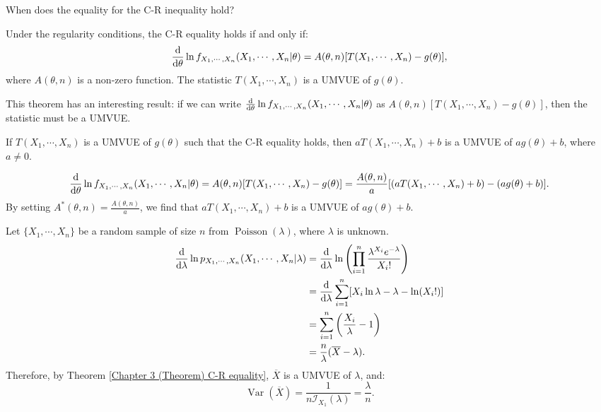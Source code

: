 \documentclass{huhtakm-template-book-v2}
\DeclareMathOperator{\Var}{Var}
\DeclareMathOperator{\Poisson}{Poisson}
\begin{document}
    When does the equality for the C-R inequality hold?
    \begin{thm}
        \label{Chapter 3 (Theorem) C-R equality}
        Under the regularity conditions, the C-R equality holds if and only if:
        \begin{equation*}
            \odv*{\ln{f_{X_{1},\cdots,X_{n}}(X_{1},\cdots,X_{n}|\theta)}}{\theta}=A(\theta,n)[T(X_{1},\cdots,X_{n})-g(\theta)],
        \end{equation*}
        where $A(\theta,n)$ is a non-zero function. The statistic $T(X_{1},\cdots,X_{n})$ is a UMVUE of $g(\theta)$. 
    \end{thm}
    This theorem has an interesting result: if we can write $\odv*{\ln{f_{X_{1},\cdots,X_{n}}(X_{1},\cdots,X_{n}|\theta)}}{\theta}$ as $A(\theta,n)[T(X_{1},\cdots,X_{n})-g(\theta)]$, then the statistic must be a UMVUE.
    \begin{lem}
        If $T(X_{1},\cdots,X_{n})$ is a UMVUE of $g(\theta)$ such that the C-R equality holds, then $aT(X_{1},\cdots,X_{n})+b$ is a UMVUE of $ag(\theta)+b$, where $a\neq 0$.
    \end{lem}
    \begin{proofing}
        \begin{equation*}
            \odv*{\ln{f_{X_{1},\cdots,X_{n}}(X_{1},\cdots,X_{n}|\theta)}}{\theta}=A(\theta,n)[T(X_{1},\cdots,X_{n})-g(\theta)]=\frac{A(\theta,n)}{a}[(aT(X_{1},\cdots,X_{n})+b)-(ag(\theta)+b)].
        \end{equation*}
        By setting $A^{*}(\theta,n)=\frac{A(\theta,n)}{a}$, we find that $aT(X_{1},\cdots,X_{n})+b$ is a UMVUE of $ag(\theta)+b$.
    \end{proofing}
    \begin{eg}
        Let $\{X_{1},\cdots,X_{n}\}$ be a random sample of size $n$ from $\Poisson(\lambda)$, where $\lambda$ is unknown.
        \begin{align*}
            \odv*{\ln{p_{X_{1},\cdots,X_{n}}(X_{1},\cdots,X_{n}|\lambda)}}{\lambda}&=\odv*{\ln\left(\prod_{i=1}^{n}\frac{\lambda^{X_{i}}e^{-\lambda}}{X_{i}!}\right)}{\lambda}\\
            &=\odv*{\sum_{i=1}^{n}[X_{i}\ln{\lambda}-\lambda-\ln(X_{i}!)]}{\lambda}\\
            &=\sum_{i=1}^{n}\left(\frac{X_{i}}{\lambda}-1\right)\\
            &=\frac{n}{\lambda}(\overline{X}-\lambda).
        \end{align*}
        Therefore, by Theorem \ref{Chapter 3 (Theorem) C-R equality}, $\overline{X}$ is a UMVUE of $\lambda$, and:
        \begin{equation*}
            \Var(\overline{X})=\frac{1}{n\mathcal{I}_{X_{1}}(\lambda)}=\frac{\lambda}{n}.
        \end{equation*}
    \end{eg}
\end{document}
